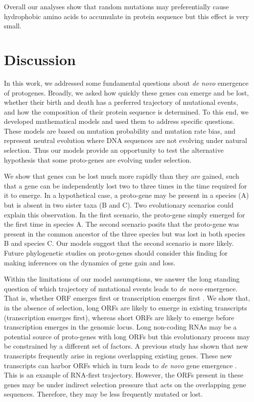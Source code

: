 \documentclass[12pt,a4paper]{article}
\begin{document}
Overall our analyses show that random mutations may preferentially cause hydrophobic amino acids to accumulate in protein sequence but this effect is very small.

\section{Discussion} 

In this work, we addressed some fundamental questions about \textit{de novo} emergence of protogenes. Broadly, we asked how quickly these genes can emerge and be lost, whether their birth and death has a preferred trajectory of mutational events, and how the composition of their protein sequence is determined. To this end, we developed mathematical models and used them to address specific questions. These models are based on mutation probability and mutation rate bias, and represent neutral evolution where DNA sequences are not evolving under natural selection. Thus our models provide an opportunity to test the alternative hypothesis that some proto-genes are evolving under selection.

We show that genes can be lost much more rapidly than they are gained, such that a gene can be independently lost two to three times in the time required for it to emerge. In a hypothetical case, a proto-gene may be present in a species (A) but is absent in two sister taxa (B and C). Two evolutionary scenarios could explain this observation. In the first scenario, the proto-gene simply emerged for the first time in species A. The second scenario posits that the proto-gene was present in the common ancestor of the three species but was lost in both species B and species C. Our models suggest that the second scenario is more likely. Future phylogenetic studies on proto-genes should consider this finding for making inferences on the dynamics of gene gain and loss.

Within the limitations of our model assumptions, we answer the long standing question of which trajectory of mutational events leads to \textit{de novo} emergence. That is, whether ORF emerges first or transcription emerges first \citep{EBB-F1000}. We show that, in the absence of selection, long ORFs are likely to emerge in existing transcripts (transcription emerges first), whereas short ORFs are likely to emerge before transcription emerges in the genomic locus. Long non-coding RNAs may be a potential source of proto-genes with long ORFs but this evolutionary process may be constrained by a different set of factors. A previous study has shown that new transcripts frequently arise in regions overlapping existing genes. These new transcripts can harbor ORFs which in turn leads to \textit{de novo} gene emergence \citep{albaYeastdenovo}. This is an example of RNA-first trajectory. However, the ORFs present in these genes may be under indirect selection pressure that acts on the overlapping gene sequences. Therefore, they may be less frequently mutated or lost.
\end{document}
